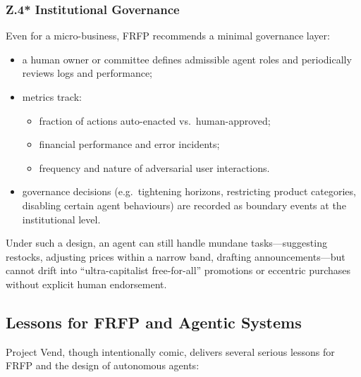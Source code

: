 \subsubsection*{Z.4* Institutional Governance}

Even for a micro-business, FRFP recommends a minimal governance layer:

\begin{itemize}
  \item a human owner or committee defines admissible agent roles and
        periodically reviews logs and performance;
  \item metrics track:
        \begin{itemize}
          \item fraction of actions auto-enacted vs.\ human-approved;
          \item financial performance and error incidents;
          \item frequency and nature of adversarial user interactions.
        \end{itemize}
  \item governance decisions (e.g.\ tightening horizons, restricting product
        categories, disabling certain agent behaviours) are recorded as
        boundary events at the institutional level.
\end{itemize}

Under such a design, an agent can still handle mundane tasks---suggesting
restocks, adjusting prices within a narrow band, drafting announcements---but
cannot drift into ``ultra-capitalist free-for-all'' promotions or eccentric
purchases without explicit human endorsement.

\subsection{Lessons for FRFP and Agentic Systems}

Project Vend, though intentionally comic, delivers several serious lessons
for FRFP and the design of autonomous agents:

